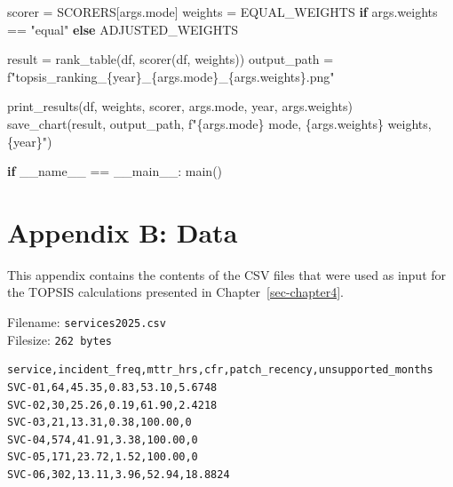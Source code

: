 \documentclass[
  12pt,
  letterpaper,
  12pt,
  oneside,
  english,
  onehalfspacing,
  headsepline]{MastersDoctoralThesis}
\newenvironment{Shaded}{\begin{snugshade}}{\end{snugshade}}
\newcommand{\ControlFlowTok}[1]{\textcolor[rgb]{0.00,0.23,0.31}{\textbf{#1}}}
\newcommand{\NormalTok}[1]{\textcolor[rgb]{0.00,0.23,0.31}{#1}}
\newcommand{\OperatorTok}[1]{\textcolor[rgb]{0.37,0.37,0.37}{#1}}
\newcommand{\SpecialCharTok}[1]{\textcolor[rgb]{0.37,0.37,0.37}{#1}}
\newcommand{\SpecialStringTok}[1]{\textcolor[rgb]{0.13,0.47,0.30}{#1}}
\newcommand{\StringTok}[1]{\textcolor[rgb]{0.13,0.47,0.30}{#1}}
\newcommand{\VariableTok}[1]{\textcolor[rgb]{0.07,0.07,0.07}{#1}}
\begin{document}
\begin{Shaded}
\begin{Highlighting}[]
\NormalTok{    scorer }\OperatorTok{=}\NormalTok{ SCORERS[args.mode]}
\NormalTok{    weights }\OperatorTok{=}\NormalTok{ EQUAL\_WEIGHTS }\ControlFlowTok{if}\NormalTok{ args.weights }\OperatorTok{==} \StringTok{"equal"} \ControlFlowTok{else}\NormalTok{ ADJUSTED\_WEIGHTS}

\NormalTok{    result }\OperatorTok{=}\NormalTok{ rank\_table(df, scorer(df, weights))}
\NormalTok{    output\_path }\OperatorTok{=} \SpecialStringTok{f"topsis\_ranking\_}\SpecialCharTok{\{}\NormalTok{year}\SpecialCharTok{\}}\SpecialStringTok{\_}\SpecialCharTok{\{}\NormalTok{args}\SpecialCharTok{.}\NormalTok{mode}\SpecialCharTok{\}}\SpecialStringTok{\_}\SpecialCharTok{\{}\NormalTok{args}\SpecialCharTok{.}\NormalTok{weights}\SpecialCharTok{\}}\SpecialStringTok{.png"}

\NormalTok{    print\_results(df, weights, scorer, args.mode, year, args.weights)}
\NormalTok{    save\_chart(result, output\_path, }\SpecialStringTok{f"}\SpecialCharTok{\{}\NormalTok{args}\SpecialCharTok{.}\NormalTok{mode}\SpecialCharTok{\}}\SpecialStringTok{ mode, }\SpecialCharTok{\{}\NormalTok{args}\SpecialCharTok{.}\NormalTok{weights}\SpecialCharTok{\}}\SpecialStringTok{ weights, }\SpecialCharTok{\{}\NormalTok{year}\SpecialCharTok{\}}\SpecialStringTok{"}\NormalTok{)}


\ControlFlowTok{if} \VariableTok{\_\_name\_\_} \OperatorTok{==} \StringTok{\textquotesingle{}\_\_main\_\_\textquotesingle{}}\NormalTok{:}
\NormalTok{    main()}
\end{Highlighting}
\end{Shaded}

\chapter{Appendix B: Data}\label{sec-appendixb}

This appendix contains the contents of the CSV files that were used as
input for the TOPSIS calculations presented in
Chapter~\ref{sec-chapter4}.

\vspace{1cm}

Filename: \texttt{services2025.csv}\\
Filesize: \texttt{262\ bytes}

\begin{verbatim}
service,incident_freq,mttr_hrs,cfr,patch_recency,unsupported_months
SVC-01,64,45.35,0.83,53.10,5.6748
SVC-02,30,25.26,0.19,61.90,2.4218
SVC-03,21,13.31,0.38,100.00,0
SVC-04,574,41.91,3.38,100.00,0
SVC-05,171,23.72,1.52,100.00,0
SVC-06,302,13.11,3.96,52.94,18.8824
\end{verbatim}
\end{document}
